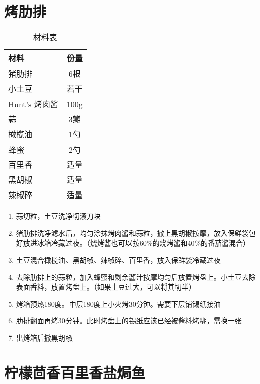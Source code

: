 \section{烤肋排}

\begin{table}[H]
    \centering
    \begin{tabular}{|l||c|}\hline
     \textbf{材料}    &  \textbf{份量}\\ \hline\hline
    猪肋排 & 6根 \\ \hline
    小土豆 & 若干  \\ \hline
    Hunt's 烤肉酱 & 100g  \\ \hline
    蒜 &  3瓣 \\ \hline
    橄榄油 & 1勺 \\ \hline
    蜂蜜 & 2勺 \\ \hline
    百里香 & 适量 \\ \hline
    黑胡椒 &  适量 \\ \hline
    辣椒碎 & 适量 \\ \hline
    \end{tabular}
    \caption{材料表}
\end{table}

\begin{enumerate}
    \item 蒜切粒，土豆洗净切滚刀块
    \item 猪肋排洗净滤水后，均匀涂抹烤肉酱和蒜粒，撒上黑胡椒按摩，放入保鲜袋包好放进冰箱冷藏过夜。（烧烤酱也可以按60\%的烧烤酱和40\%的番茄酱混合）
    \item 土豆混合橄榄油、黑胡椒、辣椒碎、百里香，放入保鲜袋冷藏过夜
    \item 去除肋排上的蒜粒，加入蜂蜜和剩余酱汁按摩均匀后放置烤盘上。小土豆去除表面香料，放置烤盘上。（如果土豆过大，可以将其切半）
    \item 烤箱预热180度。中层180度上小火烤30分钟。需要下层铺锡纸接油
    \item 肋排翻面再烤30分钟。此时烤盘上的锡纸应该已经被酱料烤糊，需换一张
    \item 出烤箱后撒黑胡椒
\end{enumerate}


\section{柠檬茴香百里香盐焗鱼}

